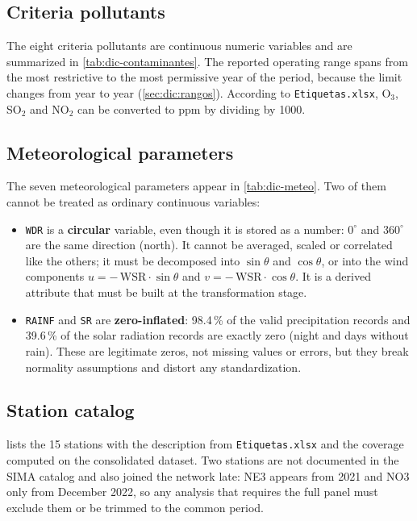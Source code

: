 \subsection{Criteria pollutants}\label{sec:dic:contaminantes}

The eight criteria pollutants are continuous numeric variables and are
summarized in \cref{tab:dic-contaminantes}. The reported operating range spans
from the most restrictive to the most permissive year of the period, because
the limit changes from year to year (\cref{sec:dic:rangos}). According to
\texttt{Etiquetas.xlsx}, O$_3$, SO$_2$ and NO$_2$ can be converted to ppm by
dividing by 1000.

\subsection{Meteorological parameters}\label{sec:dic:meteorologicos}

The seven meteorological parameters appear in \cref{tab:dic-meteo}. Two of
them cannot be treated as ordinary continuous variables:

\begin{itemize}
  \item \texttt{WDR} is a \textbf{circular} variable, even though it is stored
    as a number: $0^{\circ}$ and $360^{\circ}$ are the same direction (north).
    It cannot be averaged, scaled or correlated like the others; it must be
    decomposed into $\sin\theta$ and $\cos\theta$, or into the wind components
    $u = -\,\mathrm{WSR}\cdot\sin\theta$ and
    $v = -\,\mathrm{WSR}\cdot\cos\theta$. It is a derived attribute that must
    be built at the transformation stage.
  \item \texttt{RAINF} and \texttt{SR} are \textbf{zero-inflated}: 98.4\,\% of
    the valid precipitation records and 39.6\,\% of the solar radiation
    records are exactly zero (night and days without rain). These are
    legitimate zeros, not missing values or errors, but they break normality
    assumptions and distort any standardization.
\end{itemize}

\subsection{Station catalog}\label{sec:dic:estaciones}

 lists the 15 stations with the description from
\texttt{Etiquetas.xlsx} and the coverage computed on the consolidated
dataset. Two stations are not documented in the SIMA catalog and also joined
the network late: NE3 appears from 2021 and NO3 only from December 2022, so
any analysis that requires the full panel must exclude them or be trimmed to
the common period.

